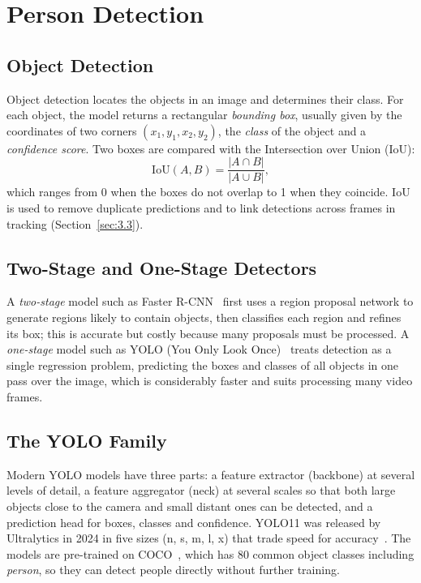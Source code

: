 \section{Person Detection}
\label{sec:3.2}

\subsection{Object Detection}
\label{sec:3.2.1}

Object detection locates the objects in an image and determines their class. For each object, the model returns a rectangular \emph{bounding box}, usually given by the coordinates of two corners $(x_1, y_1, x_2, y_2)$, the \emph{class} of the object and a \emph{confidence score}. Two boxes are compared with the Intersection over Union (IoU):
\begin{equation}
    \mathrm{IoU}(A, B) = \frac{|A \cap B|}{|A \cup B|},
    \label{eq:iou}
\end{equation}
which ranges from 0 when the boxes do not overlap to 1 when they coincide. IoU is used to remove duplicate predictions and to link detections across frames in tracking (Section~\ref{sec:3.3}).

\subsection{Two-Stage and One-Stage Detectors}
\label{sec:3.2.2}

A \emph{two-stage} model such as Faster R-CNN~\cite{ren2017fasterrcnn} first uses a region proposal network to generate regions likely to contain objects, then classifies each region and refines its box; this is accurate but costly because many proposals must be processed. A \emph{one-stage} model such as YOLO (You Only Look Once)~\cite{redmon2016yolo} treats detection as a single regression problem, predicting the boxes and classes of all objects in one pass over the image, which is considerably faster and suits processing many video frames.

\subsection{The YOLO Family}
\label{sec:3.2.3}

Modern YOLO models have three parts: a feature extractor (backbone) at several levels of detail, a feature aggregator (neck) at several scales so that both large objects close to the camera and small distant ones can be detected, and a prediction head for boxes, classes and confidence. YOLO11 was released by Ultralytics in 2024 in five sizes (n, s, m, l, x) that trade speed for accuracy~\cite{ultralytics2024yolo11docs}. The models are pre-trained on COCO~\cite{lin2014coco}, which has 80 common object classes including \emph{person}, so they can detect people directly without further training.

